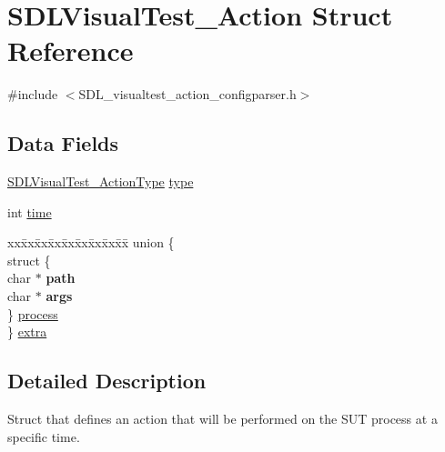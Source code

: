 \hypertarget{struct_s_d_l_visual_test___action}{\section{S\-D\-L\-Visual\-Test\-\_\-\-Action Struct Reference}
\label{struct_s_d_l_visual_test___action}
}


{\ttfamily \#include $<$S\-D\-L\-\_\-visualtest\-\_\-action\-\_\-configparser.\-h$>$}

\subsection*{Data Fields}
\begin{DoxyCompactItemize}
\item 
\hyperlink{_s_d_l__visualtest__action__configparser_8h_a383e41b8547eab149a0a4af867b3ebc6}{S\-D\-L\-Visual\-Test\-\_\-\-Action\-Type} \hyperlink{struct_s_d_l_visual_test___action_a3ab091b672fc470015f09e6c4c50dcf1}{type}
\item 
int \hyperlink{struct_s_d_l_visual_test___action_a42715f65f02da52edc5b22021d8ae670}{time}
\item 
\begin{tabbing}
xx\=xx\=xx\=xx\=xx\=xx\=xx\=xx\=xx\=\kill
union \{\\
\>struct \{\\
\>\>char $\ast$ {\bfseries path}\\
\>\>char $\ast$ {\bfseries args}\\
\>\} \hyperlink{struct_s_d_l_visual_test___action_aa43e9883c9f24718f49b984b67b1afdc}{process}\\
\} \hyperlink{struct_s_d_l_visual_test___action_a4626514a67f261290b54fb3d85ca8ddd}{extra}\\

\end{tabbing}\end{DoxyCompactItemize}


\subsection{Detailed Description}
Struct that defines an action that will be performed on the S\-U\-T process at a specific time. 

